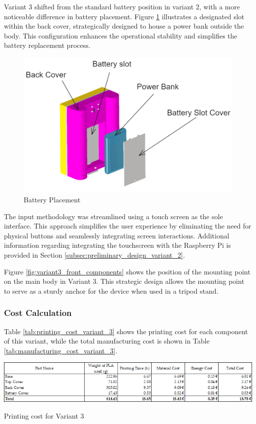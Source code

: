 Variant 3 shifted from the standard battery position in variant 2, with a more noticeable difference in battery placement. Figure \ref{fig:variant3_battery_placement} illustrates a designated slot within the back cover, strategically designed to house a power bank outside the body. This configuration enhances the operational stability and simplifies the battery replacement process.

\begin{figure}[!ht]
    \centering
    \includegraphics[width=0.5\linewidth]{texs/Part1/chapter4/image/v35.png}
    \caption{Battery Placement}
    \label{fig:variant3_battery_placement}
\end{figure}

The input methodology was streamlined using a touch screen as the sole interface. This approach simplifies the user experience by eliminating the need for physical buttons and seamlessly integrating screen interactions. Additional information regarding integrating the touchscreen with the Raspberry Pi is provided in Section \ref{subsec:preliminary_design_variant_2}.

Figure \ref{fig:variant3_front_components} shows the position of the mounting point on the main body in Variant 3. This strategic design allows the mounting point to serve as a sturdy anchor for the device when used in a tripod stand.


\subsubsection{Cost Calculation}
Table \ref{tab:printing_cost_variant_3} shows the printing cost for each component of this variant, while the total manufacturing cost is shown in Table \ref{tab:manufacturing_cost_variant_3}.

\begin{table}[H]
    \centering
    \includegraphics[width=\linewidth]{texs/Part1/chapter3/image/v3printed.png}
    \caption{Printing cost for Variant 3}
    \label{tab:printing_cost_variant_3}
\end{table}

